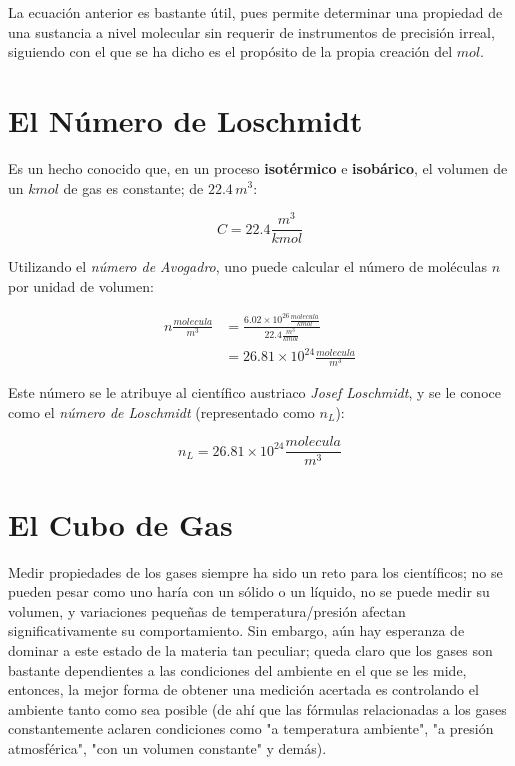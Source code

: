 \documentclass{article}
\begin{document}
La ecuación anterior es bastante útil, pues permite determinar una propiedad de una
sustancia a nivel molecular sin requerir de instrumentos de precisión irreal, siguiendo
con el que se ha dicho es el propósito de la propia creación del \(mol\).

\section*{El Número de Loschmidt}

Es un hecho conocido que, en un proceso \textbf{isotérmico} e \textbf{isobárico},
el volumen de un \(kmol\) de gas es constante; de \(22.4\,m^3\):

\[
    C = 22.4 \frac{m^3}{kmol}
\]

Utilizando el \textit{número de Avogadro}, uno
puede calcular el número de moléculas \(n\) por
unidad de volumen:

\begin{align*}
    n \frac{molecula}{m^3} & = \frac{6.02 \times 10^{26} \frac{molecula}{kmol}}{22.4 \frac{m^3}{kmol}} \\
                           & = 26.81 \times 10^{24} \frac{molecula}{m^3}
\end{align*}

Este número se le atribuye al científico austriaco
\textit{Josef Loschmidt}, y se le conoce como el
\textit{número de Loschmidt} (representado como \(n_L\)):

\[
    n_L = 26.81 \times 10^{24} \frac{molecula}{m^3}
\]

\section*{El Cubo de Gas}

Medir propiedades de los gases siempre ha sido un reto
para los científicos; no se pueden pesar como uno haría
con un sólido o un líquido, no se puede medir su volumen,
y variaciones pequeñas de temperatura/presión afectan
significativamente su comportamiento. Sin embargo, aún hay
esperanza de dominar a este estado de la materia tan peculiar;
queda claro que los gases son bastante dependientes a las
condiciones del ambiente en el que se les mide, entonces,
la mejor forma de obtener una medición acertada es controlando
el ambiente tanto como sea posible (de ahí que las fórmulas
relacionadas a los gases constantemente aclaren condiciones
como "a temperatura ambiente", "a presión atmosférica",
"con un volumen constante" y demás).
\end{document}
